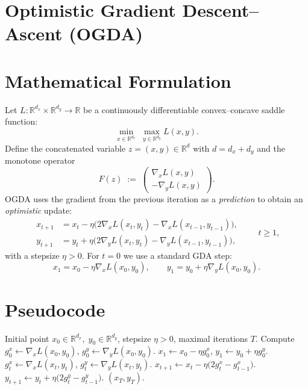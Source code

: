 \documentclass{article}
\begin{document}
\section*{Optimistic Gradient Descent--Ascent (OGDA)}

\section*{Mathematical Formulation}
Let $L:\mathbb{R}^{d_x}\times\mathbb{R}^{d_y}\rightarrow\mathbb{R}$ be a continuously differentiable convex–concave saddle function:
\[
\min_{x\in\mathbb{R}^{d_x}}\;\max_{y\in\mathbb{R}^{d_y}} L(x,y).
\]
Define the concatenated variable $z=(x,y)\in\mathbb{R}^{d}$ with $d=d_x+d_y$ and the monotone operator
\[
F(z)\;:=\;\begin{pmatrix}
\nabla_x L(x,y)\\[2mm]
-\nabla_y L(x,y)
\end{pmatrix}.
\]
OGDA uses the gradient from the previous iteration as a \emph{prediction} to obtain an \emph{optimistic} update:
\[
\boxed{
\begin{aligned}
x_{t+1}&=x_t-\eta\bigl(2\nabla_x L(x_t,y_t)-\nabla_x L(x_{t-1},y_{t-1})\bigr),\\[1mm]
y_{t+1}&=y_t+\eta\bigl(2\nabla_y L(x_t,y_t)-\nabla_y L(x_{t-1},y_{t-1})\bigr),
\end{aligned}}
\qquad t\ge 1,
\]
with a stepsize $\eta>0$.  For $t=0$ we use a standard GDA step:
\[
x_{1}=x_{0}-\eta\nabla_x L(x_{0},y_{0}),\qquad
y_{1}=y_{0}+\eta\nabla_y L(x_{0},y_{0}).
\]

\section*{Pseudocode}
\begin{algorithm}[H]
\caption{Optimistic Gradient Descent--Ascent (OGDA)}
\begin{algorithmic}[1]
\Require Initial point $x_{0}\in\mathbb{R}^{d_x},\;y_{0}\in\mathbb{R}^{d_y}$, stepsize $\eta>0$, maximal iterations $T$.
\State Compute $g^{x}_{0}\leftarrow \nabla_x L(x_{0},y_{0})$, $g^{y}_{0}\leftarrow \nabla_y L(x_{0},y_{0})$.
\State $x_{1}\leftarrow x_{0}-\eta g^{x}_{0}$,\; $y_{1}\leftarrow y_{0}+\eta g^{y}_{0}$.
    \State $g^{x}_{t}\leftarrow \nabla_x L(x_{t},y_{t})$, \quad $g^{y}_{t}\leftarrow \nabla_y L(x_{t},y_{t})$.
    \State $x_{t+1}\leftarrow x_{t}-\eta\bigl(2g^{x}_{t}-g^{x}_{t-1}\bigr)$.
    \State $y_{t+1}\leftarrow y_{t}+\eta\bigl(2g^{y}_{t}-g^{y}_{t-1}\bigr)$.
\EndFor
\State \Return $(x_{T},y_{T})$.
\end{algorithmic}
\end{algorithm}
\end{document}

